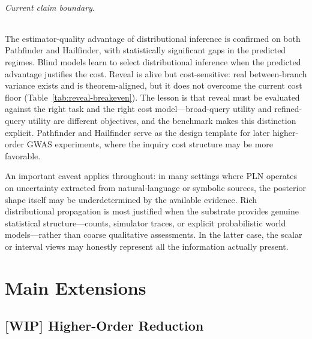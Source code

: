 \documentclass[11pt,openany]{report}
\begin{document}
\paragraph{Current claim boundary.}
The estimator-quality advantage of distributional inference is confirmed on
both Pathfinder and Hailfinder, with statistically significant gaps in the
predicted regimes.  Blind models learn to select distributional inference
when the predicted advantage justifies the cost.  Reveal is alive but
cost-sensitive: real between-branch variance exists and is theorem-aligned,
but it does not overcome the current cost floor
(Table~\ref{tab:reveal-breakeven}).  The lesson is that reveal must be
evaluated against the right task and the right cost model---broad-query
utility and refined-query utility are different objectives, and the
benchmark makes this distinction explicit.  Pathfinder and Hailfinder serve
as the design template for later higher-order GWAS experiments, where the
inquiry cost structure may be more favorable.

An important caveat applies throughout: in many settings where PLN operates
on uncertainty extracted from natural-language or symbolic sources, the
posterior shape itself may be underdetermined by the available evidence.
Rich distributional propagation is most justified when the substrate provides
genuine statistical structure---counts, simulator traces, or explicit
probabilistic world models---rather than coarse qualitative assessments.
In the latter case, the scalar or interval views may honestly represent
all the information actually present.


\part{Main Extensions}
\label{part:extensions}

\chapter{[WIP] Higher-Order Reduction}
\label{ch:higher-order}
\label{ch:hol}
\end{document}
